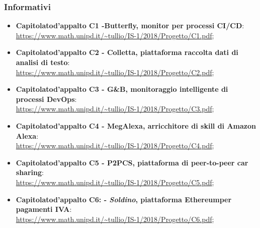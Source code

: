 \subsubsection{Informativi}
\begin{itemize}
	\item \textbf{Capitolato\glosp d'appalto C1 -Butterfly, monitor per processi CI/CD}: \\ \url{https://www.math.unipd.it/~tullio/IS-1/2018/Progetto/C1.pdf};
	
	\item \textbf{Capitolato\glosp d'appalto C2 - Colletta, piattaforma raccolta dati di analisi di testo}:\\
	\url{https://www.math.unipd.it/~tullio/IS-1/2018/Progetto/C2.pdf};
	
	\item \textbf{Capitolato\glosp d'appalto C3 - G\&B, monitoraggio intelligente di processi DevOps\glo}:\\
	\url{https://www.math.unipd.it/~tullio/IS-1/2018/Progetto/C3.pdf};
	
	\item \textbf{Capitolato\glosp d'appalto C4 - MegAlexa, arricchitore di skill di Amazon Alexa}:\\
	\url{https://www.math.unipd.it/~tullio/IS-1/2018/Progetto/C4.pdf};
	
	\item \textbf{Capitolato\glosp d'appalto C5 - P2PCS, piattaforma di peer-to-peer car sharing}:\\
	\url{https://www.math.unipd.it/~tullio/IS-1/2018/Progetto/C5.pdf};
	
	\item \textbf{Capitolato\glosp d'appalto C6: - \textit{Soldino}, piattaforma Ethereum\glosp per pagamenti IVA}:\\
	\url{https://www.math.unipd.it/~tullio/IS-1/2018/Progetto/C6.pdf};
\end{itemize}

	
	

